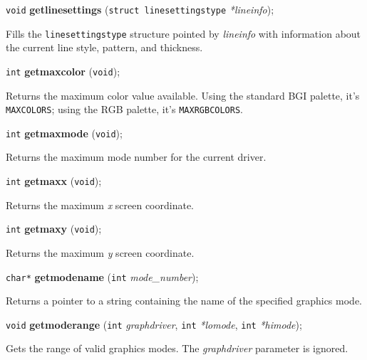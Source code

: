 \documentclass[a4paper,11pt]{article}
\newcommand{\V}{\texttt{void}}      %
\newcommand{\I}{\texttt{int}}       %
\newcommand{\func}[1]{\textbf{#1}}  %
\newcommand{\A}[1]{\emph{#1}}       %
\newcommand{\T}[1]{\texttt{#1}}     %
\newenvironment{bgi}
{ %
  \begin{snugshade}
}
{ %
  \end{snugshade}
}
\begin{document}

\begin{bgi}
\V{} \func{getlinesettings} (\texttt{struct linesettingstype}
\A{*lineinfo});
\end{bgi}

Fills the \texttt{linesettingstype} structure pointed by \A{lineinfo}
with information about the current line style, pattern, and thickness.


\begin{bgi}
\I{} \func{getmaxcolor} (\V{});
\end{bgi}

Returns the maximum color value available. Using the standard BGI
palette, it's \T{MAXCOLORS}; using the RGB palette, it's
\T{MAXRGBCOLORS}.


\begin{bgi}
\I{} \func{getmaxmode} (\V{}); 
\end{bgi}

Returns the maximum mode number for the current driver.


\begin{bgi}
\I{} \func{getmaxx} (\V{});
\end{bgi}

Returns the maximum \A{x} screen coordinate.


\begin{bgi}
\I{} \func{getmaxy} (\V{});
\end{bgi}

Returns the maximum \A{y} screen coordinate.


\begin{bgi}
\texttt{char*} \func{getmodename} (\I{} \A{mode\_number});
\end{bgi}

Returns a pointer to a string containing the name of the specified
graphics mode.


\begin{bgi}
\V{} \func{getmoderange} (\I{} \A{graphdriver}, \I{} \A{*lomode}, \I{}
\A{*himode});
\end{bgi}

Gets the range of valid graphics modes. The \A{graphdriver} parameter
is ignored.

\end{document}
